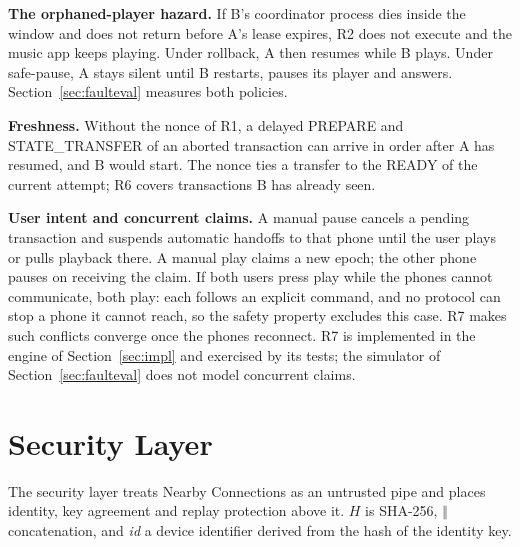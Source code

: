 \documentclass[conference]{IEEEtran}
\begin{document}
\textbf{The orphaned-player hazard.} If B's coordinator process dies inside the window and does not return before A's lease expires, R2 does not execute and the music app keeps playing. Under rollback, A then resumes while B plays. Under safe-pause, A stays silent until B restarts, pauses its player and answers. Section~\ref{sec:faulteval} measures both policies.

\textbf{Freshness.} Without the nonce of R1, a delayed PREPARE and STATE\_TRANSFER of an aborted transaction can arrive in order after A has resumed, and B would start. The nonce ties a transfer to the READY of the current attempt; R6 covers transactions B has already seen.

\textbf{User intent and concurrent claims.} A manual pause cancels a pending transaction and suspends automatic handoffs to that phone until the user plays or pulls playback there. A manual play claims a new epoch; the other phone pauses on receiving the claim. If both users press play while the phones cannot communicate, both play: each follows an explicit command, and no protocol can stop a phone it cannot reach, so the safety property excludes this case. R7 makes such conflicts converge once the phones reconnect. R7 is implemented in the engine of Section~\ref{sec:impl} and exercised by its tests; the simulator of Section~\ref{sec:faulteval} does not model concurrent claims.

\section{Security Layer}\label{sec:security}

The security layer treats Nearby Connections as an untrusted pipe and places identity, key agreement and replay protection above it. $H$ is SHA-256, $\Vert$ concatenation, and \textit{id} a device identifier derived from the hash of the identity key.
\end{document}
